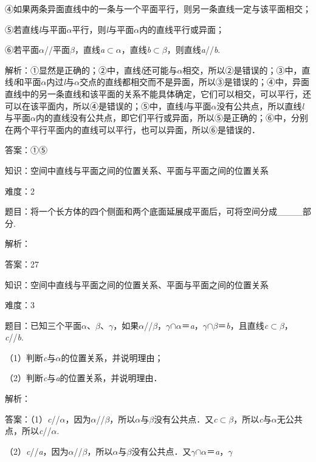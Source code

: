 \documentclass{article} %
\begin{document}
④如果两条异面直线中的一条与一个平面平行，则另一条直线一定与该平面相交；

⑤若直线\textit{l}与平面\textit{$\alpha$}平行，则\textit{l}与平面\textit{$\alpha$}内的直线平行或异面；

⑥若平面\textit{$\alpha$}//平面\textit{$\beta$}，直线\textit{a}$\mathrm{\subset }$\textit{$\alpha$}，直线\textit{b}$\mathrm{\subset }$\textit{$\beta$}，则直线\textit{a}//\textit{b}.

解析：①显然是正确的；②中，直线\textit{l}还可能与\textit{$\alpha$}相交，所以②是错误的；③中，直线\textit{l}和平面\textit{$\alpha$}内过\textit{l}与\textit{$\alpha$}交点的直线都相交而不是异面，所以③是错误的；④中，异面直线中的另一条直线和该平面的关系不能具体确定，它们可以相交，可以平行，还可以在该平面内，所以④是错误的；⑤中，直线\textit{l}与平面\textit{$\alpha$}没有公共点，所以直线\textit{l}与平面\textit{$\alpha$}内的直线没有公共点，即它们平行或异面，所以⑤是正确的；⑥中，分别在两个平行平面内的直线可以平行，也可以异面，所以⑥是错误的．

答案：①⑤

知识：空间中直线与平面之间的位置关系、平面与平面之间的位置关系

难度：2

题目：将一个长方体的四个侧面和两个底面延展成平面后，可将空间分成\_\_\_\_部分.

解析：

答案：27

知识：空间中直线与平面之间的位置关系、平面与平面之间的位置关系

难度：3

题目：已知三个平面\textit{$\alpha$}、\textit{$\beta$}、\textit{$\gamma$}，如果\textit{$\alpha$}//\textit{$\beta$}，\textit{$\gamma$}$\mathrm{\cap}$\textit{$\alpha$}＝\textit{a}，\textit{$\gamma$}$\mathrm{\cap}$\textit{$\beta$}＝\textit{b}，且直线\textit{c}$\mathrm{\subset }$\textit{$\beta$}，\textit{c}//\textit{b}.

（1）判断\textit{c}与\textit{$\alpha$}的位置关系，并说明理由；

（2）判断\textit{c}与\textit{a}的位置关系，并说明理由．

解析：

答案：（1）\textit{c}//\textit{$\alpha$}，因为\textit{$\alpha$}//\textit{$\beta$}，所以\textit{$\alpha$}与\textit{$\beta$}没有公共点．又\textit{c}$\mathrm{\subset }$\textit{$\beta$}，所以\textit{c}与\textit{$\alpha$}无公共点，所以\textit{c}//\textit{$\alpha$}.

（2）\textit{c}//\textit{a}，因为\textit{$\alpha$}//\textit{$\beta$}，所以\textit{$\alpha$}与\textit{$\beta$}没有公共点．又\textit{$\gamma$}$\mathrm{\cap}$\textit{$\alpha$}＝\textit{a}，\textit{$\gamma$}
\end{document}

